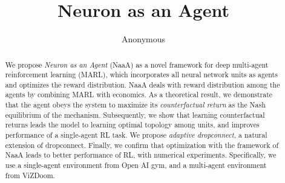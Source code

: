 \documentclass{article} %
\title{Neuron as an Agent}
\author{Anonymous}
\begin{document}
\maketitle

\begin{abstract}
We propose {\em Neuron as an Agent} (NaaA) as a novel framework for deep multi-agent reinforcement learning (MARL),
which incorporates all neural network units as agents and optimizes the reward distribution. %
NaaA deals with reward distribution among the agents by combining MARL with economics.
As a theoretical result, we demonstrate that the agent obeys the system to maximize its {\em counterfactual return} as the Nash equilibrium of the mechanism.
Subsequently, we show that learning counterfactual returns leads the model to learning optimal topology among units, and improves performance of a single-agent RL task.
We propose {\em adaptive dropconnect}, a natural extension of dropconnect.
Finally, we confirm that optimization with the framework of NaaA leads to better performance of RL, with numerical experiments.
Specifically, we use a single-agent environment from Open AI gym, and a multi-agent environment from ViZDoom.
\end{abstract}


%












\end{document}
